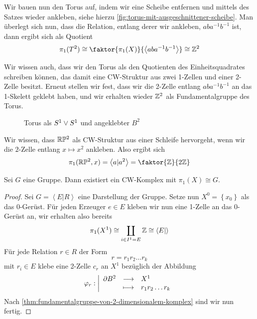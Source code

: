 \begin{example}
    Wir bauen nun den Torus auf, indem wir eine Scheibe entfernen und mittels des Satzes wieder ankleben, siehe hierzu \autoref{fig:torus-mit-ausgeschnittener-scheibe}. Man überlegt sich nun, dass die Relation, entlang derer wir ankleben, $aba^{-1}b^{-1}$ ist, dann ergibt sich als Quotient
    \[
        \pi_1(T^2) \cong \faktor{\pi_1(X)}{\left< aba^{-1}b^{-1} \right> } \cong \Z^2
    \] 

    Wir wissen auch, dass wir den Torus als den Quotienten des Einheitsquadrates schreiben können, das damit eine CW-Struktur aus zwei 1-Zellen und einer 2-Zelle besitzt. Erneut stellen wir fest, dass wir die 2-Zelle entlang $aba^{-1}b^{-1}$ an das 1-Skelett geklebt haben, und wir erhalten wieder $\mathbb{Z}^2$ als Fundamentalgruppe des Torus.
\end{example}

\begin{figure}[ht]
    \centering
    \caption{Torus als $S^1 \vee S^1$ und angeklebter  $B^2$}
    \label{fig:torus-mit-ausgeschnittener-scheibe}
\end{figure}

\begin{example}
    Wir wissen, dass $\mathbb{R}\mathbb{P}^2$ als CW-Struktur aus einer Schleife hervorgeht, wenn wir die $2$-Zelle entlang  $x \mapsto x^2$ ankleben. Also ergibt sich
    \[
        \pi_1(\R\mathbb{P}^2,x) = \left< a | a^2 \right>  = \faktor{\Z}{2\Z}
    \] 
\end{example}

\begin{corollary}
    Sei $G$ eine Gruppe. Dann existiert ein CW-Komplex mit  $\pi_1(X) \cong G$.
\end{corollary}

\begin{proof}
    Sei $G = \left< E | R \right> $ eine Darstellung der Gruppe. Setze nun $X^0 = \left \{x_0\right\} $ als das 0-Gerüst. Für jeden Erzeuger $e\in E$ kleben wir nun eine 1-Zelle an das 0-Gerüst an, wir erhalten also bereits
    \[
        \pi_1(X^1) \cong \coprod _{i \in I^1 = E} \mathbb{Z} \cong \left< E |  \right> 
    \] 
    Für jede Relation $r\in R$ der Form
    \[
    r = r_1r_2\ldots r_k
    \] 
    mit $r_i \in E$ klebe eine 2-Zelle $c_r$ an  $X^1$ bezüglich der Abbildung
        \begin{equation*}
        \varphi_r: \left| \begin{array}{c c l} 
        \partial B^2 & \longrightarrow & X^1 \\
         & \longmapsto &  r_1r_2\ldots r_k
        \end{array} \right.
    \end{equation*}
    Nach \autoref{thm:fundamentalgruppe-von-2-dimensionalem-komplex} sind wir nun fertig.
\end{proof}

